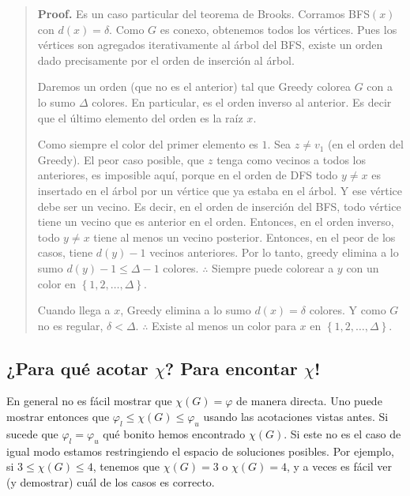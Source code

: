 \documentclass[a4paper, 12pt]{article}
\begin{document}
\small
\begin{quote}

\textbf{Proof.} Es un caso particular del teorema de Brooks. Corramos BFS$(x)$
con $d(x) = \delta$.
Como $G$ es conexo, obtenemos todos los vértices. Pues los vértices son
agregados iterativamente al árbol del BFS, existe un orden dado precisamente por
el orden de inserción al árbol.

Daremos un orden (que no es el anterior) tal que Greedy colorea $G$ con a lo
sumo $\Delta$ colores. En particular, es el orden inverso al anterior. Es decir
que el último elemento del orden es la raíz $x$.

Como siempre el color del primer elemento es $1$. Sea $z \neq v_1$ (en el orden
del Greedy). El peor caso posible, que $z$ tenga como vecinos a todos los
anteriores, es imposible aquí, porque en el orden de DFS todo $y \neq x$ es
insertado en el árbol por un vértice que ya estaba en el árbol. Y ese vértice
debe ser un vecino. Es decir, en el orden de inserción del BFS, todo vértice
tiene un vecino que es anterior en el orden. Entonces, en el orden inverso, todo
$y \neq x$ tiene al menos un vecino posterior. Entonces, en el peor de los
casos, tiene $d(y) - 1$ vecinos anteriores. Por lo tanto, greedy elimina a lo
sumo $d(y) -
1 \leq \Delta - 1$ colores. $\therefore $ Siempre puede colorear a $y$ con un
color en $\left\{ 1, 2, \ldots, \Delta \right\} $.

Cuando llega a $x$, Greedy elimina a lo sumo $d(x) = \delta$ colores. Y como $G$
no es regular, $\delta < \Delta$. $\therefore $ Existe al menos un color para
$x$ en $\left\{ 1, 2, \ldots, \Delta \right\} $.

\end{quote}
\normalsize


\subsection{¿Para qué acotar $\chi$? Para encontar $\chi$!}

En general no es fácil mostrar que $\chi(G) = \varphi$ de manera directa. Uno
puede mostrar entonces que $\varphi_{l} \leq \chi(G) \leq \varphi_{u}$ usando
las acotaciones vistas antes. Si sucede que $\varphi_l = \varphi_u$ qué bonito
hemos encontrado $\chi(G)$. Si este no es el caso de igual modo estamos
restringiendo el espacio de soluciones posibles. Por ejemplo, si $3 \leq \chi(G)
\leq 4$, tenemos que $\chi(G) = 3$ o $\chi(G) = 4$, y a veces es fácil ver (y
demostrar) cuál de los casos es correcto.
\end{document}
